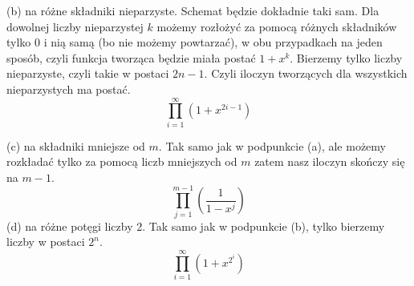 \documentclass[12pt,a4paper]{article}
\begin{document}
(b) na różne składniki nieparzyste. Schemat będzie dokładnie taki sam. Dla dowolnej liczby nieparzystej \(k\) możemy rozłożyć za pomocą różnych składników tylko 0 i nią samą (bo nie możemy powtarzać), w obu przypadkach na jeden sposób, czyli funkcja tworząca będzie miała postać \( 1 + x^k \). Bierzemy tylko liczby nieparzyste, czyli takie w postaci \( 2n-1 \). Czyli iloczyn tworzących dla wszystkich nieparzystych ma postać.
\[
	\prod_{i=1}^\infty (1 + x^{2i-1})
\]

(c) na składniki mniejsze od \(m\). Tak samo jak w podpunkcie (a), ale możemy rozkładać tylko za pomocą liczb mniejszych od \(m\) zatem nasz iloczyn skończy się na \(m-1\).
\[
	\prod_{j=1}^{m-1} \left( \frac{1}{1-x^j} \right)
\]
(d) na różne potęgi liczby 2. Tak samo jak w podpunkcie (b), tylko bierzemy liczby w postaci \(2^n\).
\[
	\prod_{i=1}^\infty (1 + x^{2^i})
\]
\end{document}
